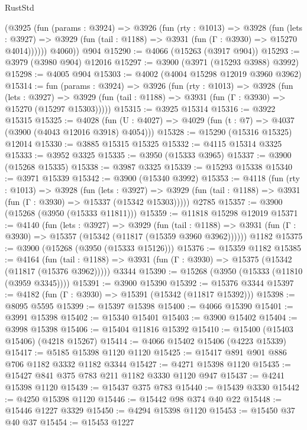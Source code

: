 \begin{lexlean}{RustStd}
\begin{coremodule}
        (@3925
          (fun (params : @3924) =>
          @3926
            (fun (rty : @1013) =>
            @3928
              (fun (lets : @3927) =>
              @3929 (fun (tail : @1188) => @3931 (fun (Γ : @3930) => @15270 @4014))))))
        @4060))
    @904
@15290 := @4066 (@15263 (@3917 @904))
@15293 := @3979 (@3980 @904) @12016
@15297 := @3900 (@3971 (@15293 @3988) @3992)
@15298 := @4005 @904
@15303 := @4002 (@4004 @15298 @12019 @3960 @3962)
@15314 := fun (params : @3924) =>
  @3926
    (fun (rty : @1013) =>
    @3928
      (fun (lets : @3927) =>
      @3929 (fun (tail : @1188) => @3931 (fun (Γ : @3930) => @15270 (@15297 @15303)))))
@15315 := @3925 @15314
@15316 := @3922 @15315
@15325 := @4028
    (fun (U : @4027) => @4029 (fun (t : @7) => @4037 (@3900 (@4043 @12016 @3918) @4054)))
@15328 := @15290 (@15316 @15325) @12014
@15330 := @3885 @15315 @15325
@15332 := @4115 @15314 @3325
@15333 := @3952 @3325
@15335 := @3950 (@15333 @3965)
@15337 := @3900 (@15268 @15335)
@15338 := @3987 @3325
@15339 := @15293 @15338
@15340 := @3971 @15339
@15342 := @3900 (@15340 @3992)
@15353 := @4118
    (fun (rty : @1013) =>
    @3928
      (fun (lets : @3927) =>
      @3929 (fun (tail : @1188) => @3931 (fun (Γ : @3930) => @15337 (@15342 @15303)))))
    @2785
@15357 := @3900 (@15268 (@3950 (@15333 @11811)))
@15359 := @11818 @15298 @12019
@15371 := @4140
    (fun (lets : @3927) =>
    @3929
      (fun (tail : @1188) =>
      @3931 (fun (Γ : @3930) => @15357 (@15342 (@11817 (@15359 @3960 @3962))))))
    @1182
@15375 := @3900 (@15268 (@3950 (@15333 @15126)))
@15376 := @15359 @1182
@15385 := @4164
    (fun (tail : @1188) => @3931 (fun (Γ : @3930) => @15375 (@15342 (@11817 (@15376 @3962)))))
    @3344
@15390 := @15268 (@3950 (@15333 (@11810 (@3959 @3345))))
@15391 := @3900 @15390
@15392 := @15376 @3344
@15397 := @4182 (fun (Γ : @3930) => @15391 (@15342 (@11817 @15392)))
@15398 := @8095 @5595
@15399 := @15397 @15398
@15400 := @4066 @15390
@15401 := @3991 @15398
@15402 := @15340 @15401
@15403 := @3900 @15402
@15404 := @3998 @15398
@15406 := @15404 @11816 @15392
@15410 := @15400 (@15403 @15406) (@4218 @15267)
@15414 := @4066 @15402 @15406 (@4223 @15339)
@15417 := @5185 @15398 @1120 @1120
@15425 := @15417 @891 @901 @886 @706 @1182 @3332 @1182 @3344
@15427 := @4271 @15398 @1120
@15435 := @15427 @841 @375 @783 @211 @1182 @3330 @1120 @947
@15437 := @4241 @15398 @1120
@15439 := @15437 @375 @783
@15440 := @15439 @3330
@15442 := @4250 @15398 @1120
@15446 := @15442 @98 @374 @40 @22
@15448 := @15446 @1227 @3329
@15450 := @4294 @15398 @1120
@15453 := @15450 @37 @40 @37
@15454 := @15453 @1227

\end{coremodule}
\end{lexlean}

